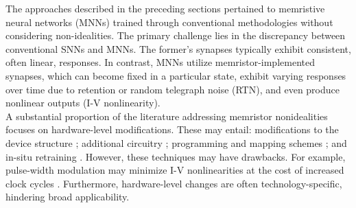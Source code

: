 \noindent The approaches described in the preceding sections pertained to memristive neural networks (MNNs) trained through conventional methodologies without considering non-idealities. The primary challenge lies in the discrepancy between conventional SNNs and MNNs. The former's synapses typically exhibit consistent, often linear, responses. In contrast, MNNs utilize memristor-implemented synapses, which can become fixed in a particular state, exhibit varying responses over time due to retention or random telegraph noise (RTN), and even produce nonlinear outputs (I-V nonlinearity).\\



\noindent A substantial proportion of the literature addressing memristor nonidealities focuses on hardware-level modifications. These may entail: modifications to the device structure \cite{fang2018improvement}; additional circuitry \cite{ambrogio2018equivalent, li2018analogue}; programming and mapping schemes \cite{xia2017stuck}; and in-situ retraining \cite{chen2017accelerator, jain2019cxdnn, wang2020ssm, li2019build}. However, these techniques may have drawbacks. For example, pulse-width modulation \cite{amirsoleimani2020memory} may minimize I-V nonlinearities at the cost of increased clock cycles \cite{cai2019fully}. Furthermore, hardware-level changes are often technology-specific, hindering broad applicability.\\

